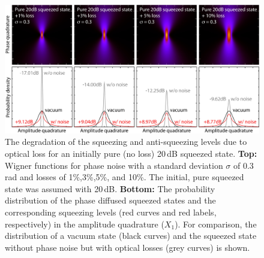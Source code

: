 \begin{figure}
\centering
\includegraphics[scale=0.77]{./Sec_Optics/Wig_20dB_loss.jpg}
\caption{The degradation of the squeezing and anti-squeezing levels due to optical loss for an initially pure (no loss) 20\,dB squeezed state.
\textbf{Top:} Wigner functions for phase noise  with a standard deviation $\sigma$ of 0.3\,rad and losses of 1\%,3\%,5\%, and 10\%. The initial, pure squeezed state was assumed with 20\,dB. \textbf{Bottom:} The probability distribution of the phase diffused squeezed states and the corresponding squeezing levels (red curves and red labels, respectively) in the  amplitude quadrature ($X_1$).  For comparison, the distribution of a vacuum state (black curves) and the squeezed state without phase noise but with optical losses (grey curves) is shown.}
\label{fig:phasediffusedSQZ20dB}
\end{figure}


